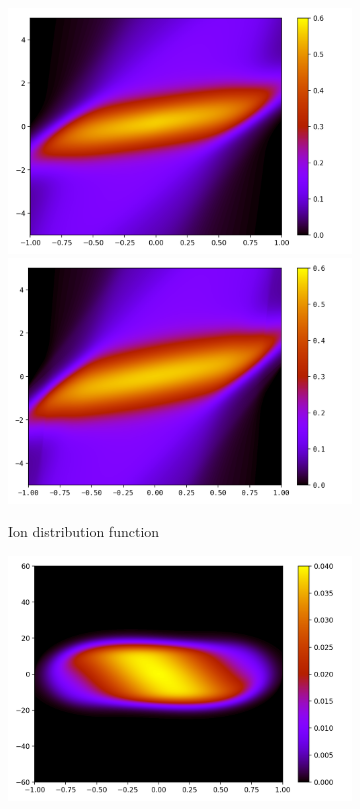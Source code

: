 \documentclass{article}
\numberwithin{equation}{section}
\newcommand{\imh}{\textheight} %
\newcommand{\imw}{\textwidth} %
\begin{document}
\begin{figure}
	\begin{subfigure}{\textwidth}
		\centering
		\includegraphics[height=\imh,width=\imw]{images/fiT0p2_FD.png}
		\includegraphics[height=\imh,width=\imw]{images/fiT0p2.png}
		\caption{Ion distribution function}
		\label{subfig:compT02_ion}
	\end{subfigure}
	\begin{subfigure}{\textwidth}
		\centering
		\includegraphics[height=\imh,width=\imw]{images/feT0p2_FD.png}

\end{subfigure}
\end{figure}
\end{document}
